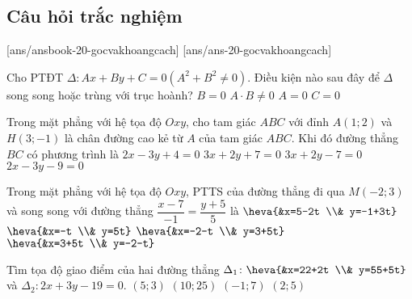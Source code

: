 \subsection{Câu hỏi trắc nghiệm}
	[ans/ansbook-20-gocvakhoangcach]
	[ans/ans-20-gocvakhoangcach]
	\begin{ex}%
		Cho PTĐT $\Delta \colon Ax+By+C=0\left(A^2+B^2 \ne 0\right)$. Điều kiện nào sau đây để $\Delta$ song song hoặc trùng với trục hoành?
		\choice
		{$B=0$}
		{$A\cdot B \ne 0$}
		{\True $A=0$}
		{$C=0$}
	\end{ex}
	\begin{ex}%
		Trong mặt phẳng với hệ tọa độ $Oxy$, cho tam giác $ABC$ với đỉnh $A(1;2)$ và $H(3;-1)$ là chân đường cao kẻ từ $A$ của tam giác $ABC$. Khi đó đường thẳng $BC$ có phương trình là
		\choice
		{$2x-3y+4=0$}
		{$3x+2y+7=0$}
		{$3x+2y-7=0$}
		{\True $2x-3y-9=0$}
	\end{ex}
	\begin{ex}%
		Trong mặt phẳng với hệ tọa độ $Oxy$, PTTS của đường thẳng đi qua $M(-2;3)$ và song song với đường thẳng $\dfrac{x-7}{-1}=\dfrac{y+5}{5}$ là
		\choice
		{$\heva{&x=5-2t \\& y=-1+3t}$}
		{$\heva{&x=-t \\& y=5t}$}
		{\True $\heva{&x=-2-t \\& y=3+5t}$}
		{$\heva{&x=3+5t \\& y=-2-t}$}
	\end{ex}
	\begin{ex}%
		Tìm tọa độ giao điểm của hai đường thẳng $\Delta_1 \colon \heva{&x=22+2t \\& y=55+5t}$ và $\Delta_2 \colon 2x+3y-19=0$.
		\choice
		{$(5;3)$}
		{$(10;25)$}
		{$(-1;7)$}
		{\True $(2;5)$}
	\end{ex}
